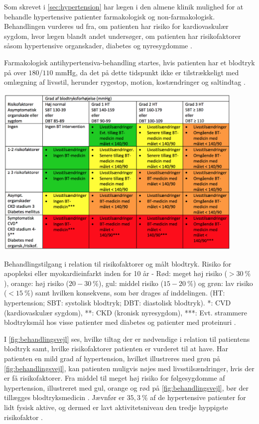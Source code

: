Som skrevet i \autoref{sec:hypertension} har lægen i den almene klinik mulighed for at behandle hypertensive patienter farmakologisk og non-farmakologisk. Behandlingen vurderes ud fra, om patienten har risiko for kardiovaskulær sygdom, hvor lægen blandt andet undersøger, om patienten har risikofaktorer såsom hypertensive organskader, diabetes og nyresygdomme \citep{promedicin2016}.

Farmakologisk antihypertensiva-behandling startes, hvis patienten har et blodtryk på over $180$/$110$ mmHg, da det på dette tidspunkt ikke er tilstrækkeligt med omlægning af livsstil, herunder rygestop, motion, kostændringer og saltindtag \citep{pedersen2016, bech2015}. 

\begin{table}[H]
\centering
\includegraphics[width=0.9\textwidth]{figures/behandlingsvejl}
\caption{Behandlingstilgang i relation til risikofaktorer og målt blodtryk. Risiko for apopleksi eller myokardieinfarkt inden for 10 år - Rød: meget høj risiko ($>30~\%$), orange: høj risiko ($20-30~\%$), gul: middel risiko ($15-20~\%$) og grøn: lav risiko ($<15~\%$) samt hvilken konsekvens, som bør drages af inddelingen. (HT: hypertension; SBT: systolisk blodtryk; DBT: diastolisk blodtryk). *: CVD (kardiovaskulær sygdom), **: CKD (kronisk nyresygdom), ***: Evt. strammere blodtryksmål hos visse patienter med diabetes og patienter med proteinuri \citep{bech2015}.}
\label{fig:behandlingsvejl}
\end{table}

\noindent
I \autoref{fig:behandlingsvejl} ses, hvilke tiltag der er nødvendige i relation til patientens blodtryk samt, hvilke risikofaktorer patienten er vurderet til at have. Har patienten en mild grad af hypertension, hvilket illustreres med grøn på \autoref{fig:behandlingsvejl}, kan patienten muligvis nøjes med livsstilsændringer, hvis der er få risikofaktorer. Fra middel til meget høj risiko for følgesygdomme af hypertension, illustreret med gul, orange og rød på \autoref{fig:behandlingsvejl}, bør der tillægges blodtryksmedicin \citep{bech2015}.
Jævnfør \citeauthor{munck2007} er $35,3~\%$ af de hypertensive patienter for lidt fysisk aktive, og dermed er lavt aktivitetsniveau den tredje hyppigste risikofaktor \citep{munck2007}.

